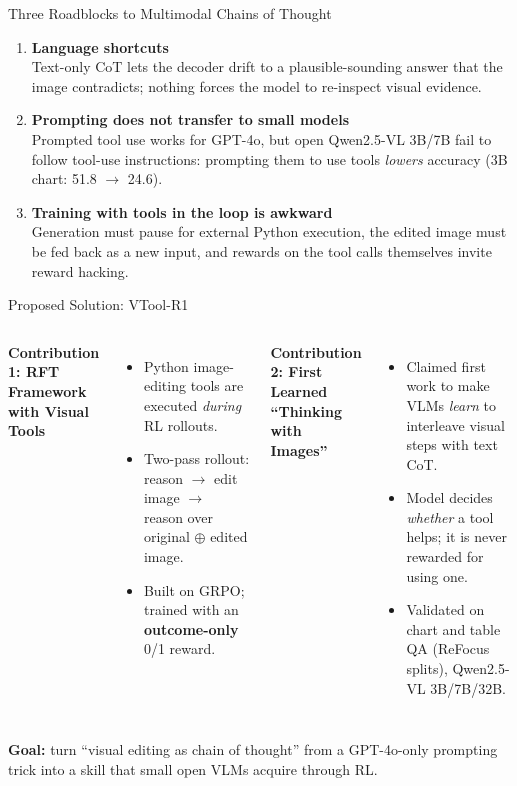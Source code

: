 \documentclass[aspectratio=169]{beamer}
\begin{document}
\begin{frame}{Three Roadblocks to Multimodal Chains of Thought}
  \begin{enumerate}
    \setlength{\itemsep}{0.55cm}
    \item \textbf{\textcolor{deepgold}{Language shortcuts}}\\
      Text-only CoT lets the decoder drift to a plausible-sounding answer that the image
      contradicts; nothing forces the model to re-inspect visual evidence.
    \item \textbf{\textcolor{deepgold}{Prompting does not transfer to small models}}\\
      Prompted tool use works for GPT-4o, but open Qwen2.5-VL 3B/7B fail to follow
      tool-use instructions: prompting them to use tools \emph{lowers} accuracy (3B chart: 51.8 $\rightarrow$ 24.6).
    \item \textbf{\textcolor{deepgold}{Training with tools in the loop is awkward}}\\
      Generation must pause for external Python execution, the edited image must be fed
      back as a new input, and rewards on the tool calls themselves invite reward hacking.
  \end{enumerate}
\end{frame}

\begin{frame}{Proposed Solution: VTool-R1}
  \begin{columns}[T]
    \textbf{\textcolor{medgreen}{Contribution 1: RFT Framework with Visual Tools}}
    \begin{itemize}
      \item Python image-editing tools are executed \emph{during} RL rollouts.
      \item Two-pass rollout: reason $\rightarrow$ edit image $\rightarrow$ reason over
            original $\oplus$ edited image.
      \item Built on GRPO; trained with an \textbf{outcome-only} 0/1 reward.
    \end{itemize}
    \textbf{\textcolor{medgreen}{Contribution 2: First Learned ``Thinking with Images''}}
    \begin{itemize}
      \item Claimed first work to make VLMs \emph{learn} to interleave visual steps with text CoT.
      \item Model decides \emph{whether} a tool helps; it is never rewarded for using one.
      \item Validated on chart and table QA (ReFocus splits), Qwen2.5-VL 3B/7B/32B.
    \end{itemize}
  \end{columns}
  \vspace{0.6cm}
  \begin{center}
    \textbf{Goal:} turn ``visual editing as chain of thought'' from a GPT-4o-only prompting trick
    into a skill that small open VLMs acquire through RL.
  \end{center}
\end{frame}
\end{document}
